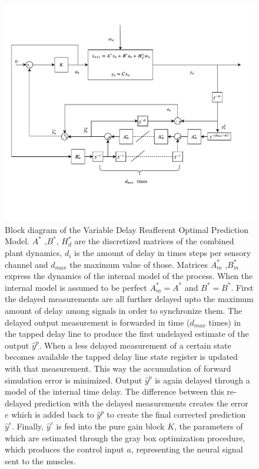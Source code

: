  \begin{figure}[h!]
    \centering

    \includegraphics[width=\linewidth,trim={0 2.8cm 0 2cm},clip]{images/VDROP_block.pdf}
    \caption{Block diagram of the Variable Delay Reafferent Optimal Prediction Model. \ensuremath{A^*} ,\ensuremath{B^*}, \ensuremath{H_d^*} are the discretized matrices of the combined plant dynamics, \ensuremath{d_i} is the amount of delay in times steps per sensory channel and \ensuremath{d_{max}} the maximum value of those. Matrices \ensuremath{A_m^*} ,\ensuremath{B_m^*} express the dynamics of the internal model of the process. When the internal model is assumed to be perfect \ensuremath{A_m^*=A^*} and \ensuremath{B^*=B^*}. First the delayed measurements are all further delayed upto the maximum amount of delay among signals  in order to synchronize them.  The delayed output measurement  is forwarded in time (\ensuremath{d_{max}} times) in the tapped delay line to produce the first undelayed estimate of the output \ensuremath{\hat{y}^p}. When a less delayed measurement  of a certain state becomes available the tapped delay line  state register is updated with that measurement. This way the accumulation of forward simulation error is minimized. Output \ensuremath{\hat{y}^p} is again delayed through a model of the  internal time delay. The difference between this re-delayed prediction with the delayed measurements creates the error \ensuremath{e} which is added back to  \ensuremath{\hat{y}^p}  to create the final corrected prediction \ensuremath{\hat{y}^c}. Finally, \ensuremath{\hat{y}^c} is fed into the pure gain block \ensuremath{K}, the parameters of which are estimated through the gray box optimization procedure, which produces the control input \ensuremath{a}, representing the neural signal sent to the muscles.}
    \label{fig:paper4}
\end{figure}

